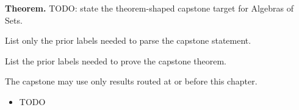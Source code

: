 \label{cap:algebras-of-sets}

\begin{tcolorbox}[
  colback=gray!6,
  colframe=gray!40,
  arc=2pt,
  left=8pt, right=8pt, top=6pt, bottom=6pt,
  title={\small\textbf{Capstone Theorem}},
  fonttitle=\small\bfseries
]
\textbf{Theorem.}
TODO: state the theorem-shaped capstone target for Algebras of Sets.
\end{tcolorbox}

\begin{remark*}
List only the prior labels needed to parse the capstone statement.
\end{remark*}

\begin{remark*}
List the prior labels needed to prove the capstone theorem.
\end{remark*}

\begin{remark*}
The capstone may use only results routed at or before this chapter.
\end{remark*}

\begin{dependencies}
\begin{itemize}
  \item TODO
\end{itemize}
\end{dependencies}

\clearpage
